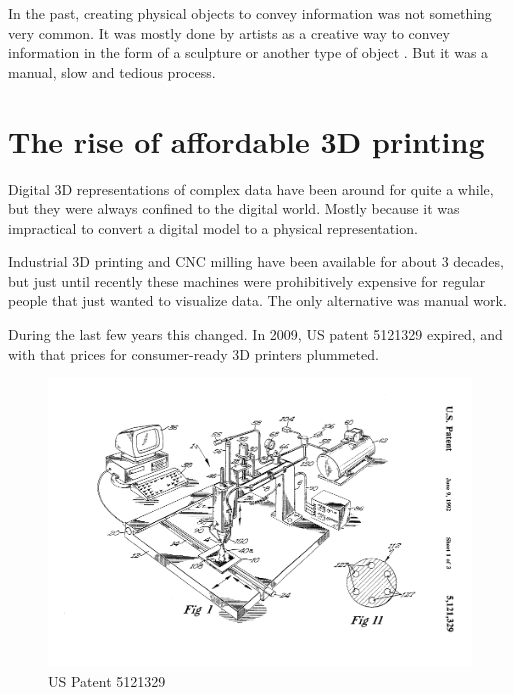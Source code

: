 In the past, creating physical objects to convey information was not something
very common. It was mostly done by artists as a creative way to convey
information in the form of a sculpture or another type of object
\cite{day:2009}\cite{schenker:2012}. But it was a manual, slow and tedious
process.


\section{The rise of affordable 3D printing}\label{sec:history-3dprinting}

Digital 3D representations of complex data have been around for quite a
while\cite{marcus:2003}, but they were always confined to the digital world.
Mostly because it was impractical to convert a digital model to a physical
representation.

Industrial 3D printing and CNC milling have been available for about 3 decades,
but just until recently these machines were prohibitively expensive for regular
people that just wanted to visualize data. The only alternative was manual work.


During the last few years this changed. In 2009, US patent 5121329
\cite{us5121329:1992} expired, and with that prices for consumer-ready 3D
printers plummeted.

\begin{figure}[h]
	\centering
	\includegraphics[width=\textwidth]{images/US5121329-1.png}
	\caption{US Patent 5121329}
	\label{img:us5121329a}
\end{figure}

